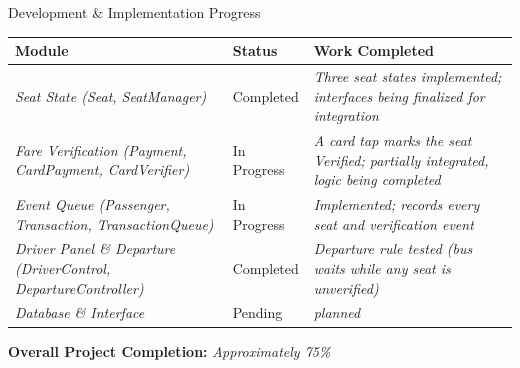 \documentclass[aspectratio=169,11pt]{beamer}
\newcommand{\smallnote}[1]{%
\vspace{0.08cm}
{\scriptsize\color{GEUGrey}#1}
}
\newcommand{\placeholder}[1]{%
\textit{\color{GEUGrey}#1}
}
\begin{document}
\begin{frame}{Development \& Implementation Progress}

\scriptsize
\vspace{-8mm}

\begin{center}

\renewcommand{\arraystretch}{1.25}

\begin{tabularx}{.96\textwidth}
{@{}p{3cm}p{2.2cm}X@{}}

\toprule
\textbf{Module} &
\textbf{Status} &
\textbf{Work Completed}\\
\midrule

\placeholder{Seat State (Seat, SeatManager)} &
Completed &
\placeholder{Three seat states implemented; interfaces being finalized for integration}\\

\placeholder{Fare Verification (Payment, CardPayment, CardVerifier)} &
In Progress &
\placeholder{A card tap marks the seat Verified; partially integrated, logic being completed}\\

\placeholder{Event Queue (Passenger, Transaction, TransactionQueue)} &
In Progress &
\placeholder{Implemented; records every seat and verification event}\\

\placeholder{Driver Panel \& Departure (DriverControl, DepartureController)} &
Completed &
\placeholder{Departure rule tested (bus waits while any seat is unverified)}\\

\placeholder{Database \& Interface} &
Pending &
\placeholder{planned}\\

\bottomrule

\end{tabularx}

\end{center}

\vspace{-3mm}

\begin{center}
\colorbox{GEULightBlue}{
\parbox{.65\textwidth}{
\centering
\textbf{Overall Project Completion:}
\placeholder{Approximately 75\%}
}}
\end{center}

\vfill


\end{frame}
\end{document}
